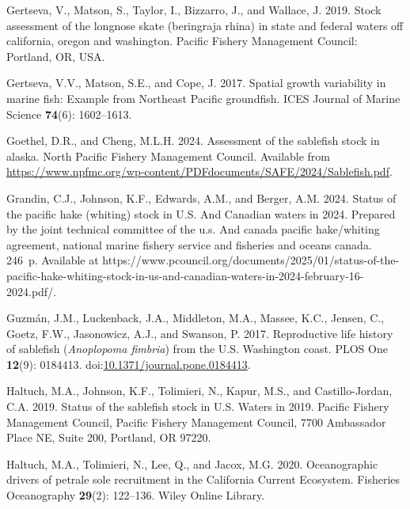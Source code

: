 \documentclass[
  english,
]{article}
\newlength{\cslhangindent}
\newenvironment{CSLReferences}[2] %
 {\begin{list}{}{%
  \setlength{\itemindent}{0pt}
  \setlength{\leftmargin}{0pt}
  \setlength{\parsep}{0pt}
  \ifodd #1
   \setlength{\leftmargin}{\cslhangindent}
   \setlength{\itemindent}{-1\cslhangindent}
  \fi
  \setlength{\itemsep}{#2\baselineskip}}}
 {\end{list}}
\begin{document}
\begin{CSLReferences}{1}{0}
Gertseva, V., Matson, S., Taylor, I., Bizzarro, J., and Wallace, J.
2019. Stock assessment of the longnose skate (beringraja rhina) in state
and federal waters off california, oregon and washington. Pacific
Fishery Management Council: Portland, OR, USA.

Gertseva, V.V., Matson, S.E., and Cope, J. 2017. Spatial growth
variability in marine fish: Example from {N}ortheast {P}acific
groundfish. {ICES} Journal of Marine Science \textbf{74}(6): 1602--1613.

Goethel, D.R., and Cheng, M.L.H. 2024. Assessment of the sablefish stock
in alaska. North Pacific Fishery Management Council. Available from
\url{https://www.npfmc.org/wp-content/PDFdocuments/SAFE/2024/Sablefish.pdf}.

Grandin, C.J., Johnson, K.F., Edwards, A.M., and Berger, A.M. 2024.
Status of the pacific hake (whiting) stock in {U}.{S}. And {C}anadian
waters in 2024. Prepared by the joint technical committee of the u.s.
And canada pacific hake/whiting agreement, national marine fishery
service and fisheries and oceans canada. 246~p. Available at
{https://www.pcouncil.org/documents/2025/01/status-of-the-pacific-hake-whiting-stock-in-us-and-canadian-waters-in-2024-february-16-2024.pdf/}.

Guzmán, J.M., Luckenback, J.A., Middleton, M.A., Massee, K.C., Jensen,
C., Goetz, F.W., Jasonowicz, A.J., and Swanson, P. 2017. Reproductive
life history of sablefish (\emph{{A}noplopoma fimbria}) from the
{U}.{S}. {W}ashington coast. {PLOS} One \textbf{12}(9): 0184413.
doi:\href{https://doi.org/10.1371/journal.pone.0184413}{10.1371/journal.pone.0184413}.

Haltuch, M.A., Johnson, K.F., Tolimieri, N., Kapur, M.S., and
Castillo-Jordan, C.A. 2019. Status of the sablefish stock in {U.S.}
Waters in 2019. Pacific Fishery Management Council, Pacific Fishery
Management Council, 7700 Ambassador Place NE, Suite 200, Portland, OR
97220.

Haltuch, M.A., Tolimieri, N., Lee, Q., and Jacox, M.G. 2020.
{Oceanographic drivers of petrale sole recruitment in the California
Current Ecosystem}. Fisheries Oceanography \textbf{29}(2): 122--136.
Wiley Online Library.


\end{CSLReferences}
\end{document}
